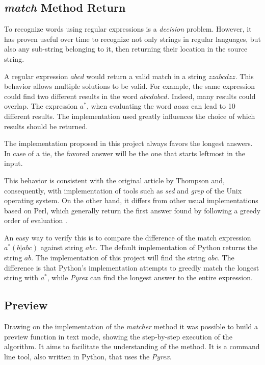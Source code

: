 \documentclass{llncs}
\begin{document}
\subsection{\emph{match} Method Return}

To recognize words using regular expressions is a \emph {decision} problem. However, it has proven useful over time to recognize not only strings in regular languages, but also any sub-string belonging to it, then returning their location in the source string.

A regular expression $abcd$ would return a valid match in a string $zzabcdzz$. This behavior allows multiple solutions to be valid. For example, the same expression could find two different results in the word $abcdabcd$. Indeed, many results could overlap. The expression $a^*$, when evaluating the word $aaaa$ can lead to 10 different results. The implementation used greatly influences the choice of which results should be returned. 

The implementation proposed in this project always favors the longest answers. In case of a tie, the favored answer will be the one that starts leftmost in the input. 

This behavior is consistent with the original article by Thompson and, consequently, with implementation of tools such as \emph{sed} and \emph{grep} of the Unix operating system. On the other hand, it differs from other usual implementations based on Perl, which generally return the first answer found by following a greedy order of evaluation \cite{bib:Cox07}. 

An easy way to verify this is to compare the difference of the match expression
$a^*(b|abc)$ against string $abc$. The default implementation of Python returns the string $ab$. The implementation of this project will find the string $abc$. The difference is that Python's implementation attempts to greedly match the longest string with $a^*$, while \emph{Pyrex} can find the longest answer to the entire expression. 

\subsection{Preview}

Drawing on the implementation of the \emph{matcher} method it was possible to build a preview function in text mode, showing the step-by-step execution of the algorithm. It aims to facilitate the understanding of the method. It is a command line tool, also written in Python, that uses the \emph{Pyrex}. 
\end{document}
